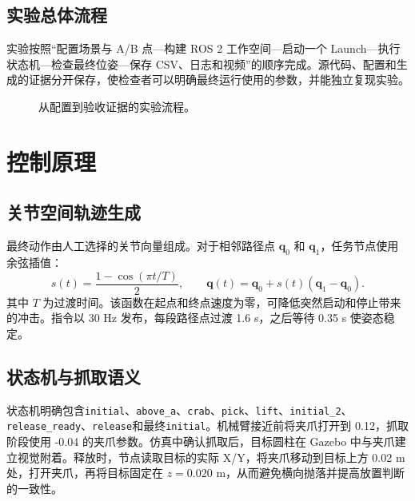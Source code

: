 \documentclass[UTF8,11pt,a4paper]{ctexart}
\newcommand{\code}[1]{\texttt{\footnotesize #1}}\newcommand{\resultbox}[1]{\begin{center}\fcolorbox{Navy}{Sky}{\parbox{0.93\textwidth}{\small #1}}\end{center}}
\begin{document}
\subsection{实验总体流程}
实验按照“配置场景与 A/B 点—构建 ROS 2 工作空间—启动一个 Launch—执行状态机—检查最终位姿—保存 CSV、日志和视频”的顺序完成。源代码、配置和生成的证据分开保存，使检查者可以明确最终运行使用的参数，并能独立复现实验。
\begin{figure}[H]\centering{}\caption{从配置到验收证据的实验流程。}\label{fig:workflowzh}\end{figure}

\section{控制原理}
\subsection{关节空间轨迹生成}
最终动作由人工选择的关节向量组成。对于相邻路径点 $\mathbf q_0$ 和 $\mathbf q_1$，任务节点使用余弦插值：\[s(t)=\frac{1-\cos(\pi t/T)}{2},\qquad \mathbf q(t)=\mathbf q_0+s(t)(\mathbf q_1-\mathbf q_0).\]其中 $T$ 为过渡时间。该函数在起点和终点速度为零，可降低突然启动和停止带来的冲击。指令以 30 Hz 发布，每段路径点过渡 1.6 s，之后等待 0.35 s 使姿态稳定。
\subsection{状态机与抓取语义}
状态机明确包含\code{initial}、\code{above\_a}、\code{crab}、\code{pick}、\code{lift}、\code{initial\_2}、\code{release\_ready}、\code{release}和最终\code{initial}。机械臂接近前将夹爪打开到 0.12，抓取阶段使用 -0.04 的夹爪参数。仿真中确认抓取后，目标圆柱在 Gazebo 中与夹爪建立视觉附着。释放时，节点读取目标的实际 X/Y，将夹爪移动到目标上方 0.02 m 处，打开夹爪，再将目标固定在 $z=0.020$ m，从而避免横向抛落并提高放置判断的一致性。
\end{document}
